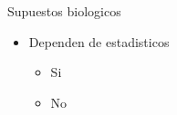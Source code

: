 \documentclass[
  11pt,
  ignorenonframetext,
]{beamer}
\providecommand{\tightlist}{%
  \setlength{\itemsep}{0pt}\setlength{\parskip}{0pt}}
\begin{document}
\begin{frame}{Supuestos biologicos}
\protect\hypertarget{supuestos-biologicos}{}
\begin{itemize}
\item
  Dependen de estadisticos

  \begin{itemize}
  \tightlist
  \item
    Si
  \item
    No
  \end{itemize}
\end{itemize}
\end{frame}
\end{document}
